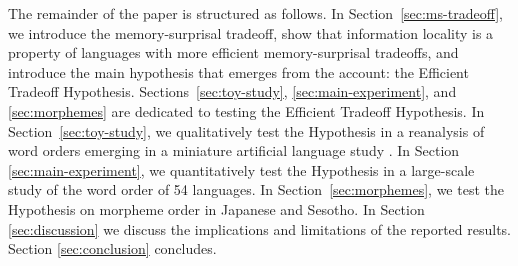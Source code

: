 The remainder of the paper is structured as follows. In Section~\ref{sec:ms-tradeoff}, we introduce the memory-surprisal tradeoff, show that information locality is a property of languages with more efficient memory-surprisal tradeoffs, and introduce the main hypothesis that emerges from the account: the Efficient Tradeoff Hypothesis. Sections~\ref{sec:toy-study}, \ref{sec:main-experiment}, and \ref{sec:morphemes} are dedicated to testing the Efficient Tradeoff Hypothesis. In Section~\ref{sec:toy-study}, we qualitatively test the Hypothesis in a reanalysis of word orders emerging in a miniature artificial language study \citep{fedzechkina-human-2017}.
In Section \ref{sec:main-experiment}, we quantitatively test the Hypothesis in a large-scale study of the word order of 54 languages. In Section~\ref{sec:morphemes}, we test the Hypothesis on morpheme order in Japanese and Sesotho.
In Section \ref{sec:discussion} we discuss the implications and limitations of the reported results.
Section \ref{sec:conclusion} concludes.



